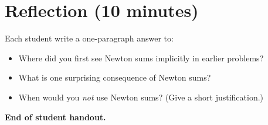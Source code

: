 \documentclass{tufte-handout}
\begin{document}
\section*{Reflection (10 minutes)}
Each student write a one-paragraph answer to:
\begin{itemize}
  \item Where did you first see Newton sums implicitly in earlier problems?
  \item What is one surprising consequence of Newton sums?
  \item When would you \emph{not} use Newton sums? (Give a short justification.)
\end{itemize}


\bigskip
\noindent\textbf{End of student handout.}
\end{document}
